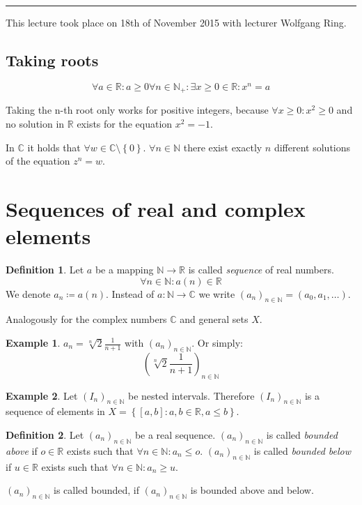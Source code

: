 \documentclass[a4paper,landscape,twocolumn]{article}
\theoremstyle{definition}
\newtheorem{defi}{Definition}
\newtheorem{ex}{Example}
\newcommand\set[1]{\left\{#1\right\}}
\newcommand\meta[3]{\hrule{} This #1 took place on #2 with lecturer #3.\par}
\begin{document}
\meta{lecture}{18th of November 2015}{Wolfgang Ring}

\subsection{Taking roots}
%
\[ \forall a \in \mathbb R: a \geq 0 \forall n \in \mathbb N_+: \exists x \geq 0 \in \mathbb R: x^n = a \]

Taking the n-th root only works for positive integers, because $\forall x \geq 0: x^2 \geq 0$
and no solution in $\mathbb R$ exists for the equation $x^2 = -1$.

In $\mathbb C$ it holds that $\forall w \in \mathbb C \setminus \set{0}$.
$\forall n \in \mathbb N$ there exist exactly $n$ different solutions of the equation $z^n = w$.

\section{Sequences of real and complex elements}
\begin{defi}
  Let $a$ be a mapping $\mathbb N \rightarrow \mathbb R$ is called \emph{sequence} of real numbers.
  \[ \forall n \in \mathbb N: a(n) \in \mathbb R \]
  We denote $a_n \coloneqq a(n)$.
  Instead of $a: \mathbb N \rightarrow \mathbb C$ we write $(a_n)_{n \in \mathbb N} = (a_0, a_1, \ldots)$.

  Analogously for the complex numbers $\mathbb C$ and general sets $X$.
\end{defi}

\begin{ex}
  $a_n = \sqrt[n]{2} \frac{1}{n + 1}$ with $(a_n)_{n \in \mathbb N}$. Or simply:
  \[ \left(\sqrt[n]{2}\frac{1}{n + 1}\right)_{n \in \mathbb N} \]
\end{ex}

\begin{ex}
  Let $(I_n)_{n \in \mathbb N}$ be nested intervals.
  Therefore $(I_n)_{n \in \mathbb N}$ is a sequence of elements in $X = \set{[a,b]: a,b \in \mathbb R, a \leq b}$.
\end{ex}

\begin{defi}
  Let $(a_n)_{n \in \mathbb N}$ be a real sequence.
  $(a_n)_{n \in \mathbb N}$ is called \emph{bounded above} if $o \in \mathbb R$ exists such that $\forall n \in \mathbb N: a_n \leq o$.
  $(a_n)_{n \in \mathbb N}$ is called \emph{bounded below} if $u \in \mathbb R$ exists such that $\forall n \in \mathbb N: a_n \geq u$.

  $(a_n)_{n \in \mathbb N}$ is called bounded, if $(a_n)_{n \in \mathbb N}$ is bounded above and below.
\end{defi}
\end{document}

